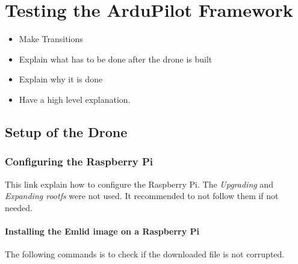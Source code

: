 \chapter{Testing the ArduPilot Framework}

{\color{red}
\begin{itemize}
    \item Make Transitions
    \item Explain what has to be done after the drone is built
    \item Explain why it is done
    \item Have a high level explanation.
\end{itemize}
}

\section{Setup of the Drone}
\subsection{Configuring the Raspberry Pi}
This link \cite{emlid_rpi_config} explain how to configure the Raspberry Pi. The \textit{Upgrading} and \textit{Expanding rootfs} were not used. It recommended to not follow them if not needed.

\subsubsection{Installing the Emlid image on a Raspberry Pi}
The following commands is to check if the downloaded file is not corrupted.

